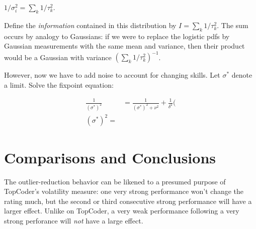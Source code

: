 \documentclass{article}
\begin{document}
$1/\sigma_i^2 = \sum_k 1/\tau_k^2$.

Define the \emph{information} contained in this distribution by $I = \sum_k 1/\tau_k^2$. The sum occurs by analogy to Gaussians: if we were to replace the logistic pdfs by Gaussian measurements with the same mean and variance, then their product would be a Gaussian with variance $(\sum_k 1/\tau_k^2)^{-1}$.

However, now we have to add noise to account for changing skills. Let $\sigma^*$ denote a limit. Solve the fixpoint equation:

\begin{align}
\frac{1}{(\sigma^*)^2} &= \frac{1}{(\sigma^*)^2+\nu^2} + \frac{1}{\delta^2}(
\\(\sigma^*)^2 = 
\end{align}

\section{Comparisons and Conclusions}

The outlier-reduction behavior can be likened to a presumed purpose of TopCoder's volatility measure: one very strong performance won't change the rating much, but the second or third consecutive strong performance will have a larger effect. Unlike on TopCoder, a very weak performance following a very strong perforance will \emph{not} have a large effect.
\end{document}
